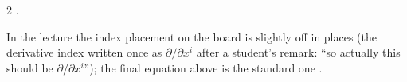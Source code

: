 \begin{paracol}{2}
.
\begin{coursenote}
In the lecture the index placement on the board is slightly off in places (the derivative index written once as $\partial/\partial x^i$ after a student's remark: ``so actually this should be $\partial/\partial x^i$''); the final equation above is the standard one .
\end{coursenote}


\end{paracol}
